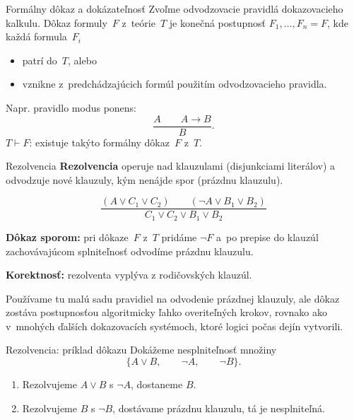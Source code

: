 \documentclass[12pt]{beamer}
\newcommand{\limpl}{\rightarrow}
\begin{document}
\begin{frame}{Formálny dôkaz a dokázateľnosť}
  Zvoľme odvodzovacie pravidlá dokazovacieho kalkulu.
  \alert{Dôkaz formuly~$F$ z~teórie~$T$} je konečná postupnosť
  $F_1,\ldots,F_n=F$, kde každá formula~$F_i$
  \begin{itemize}
    \item patrí do~$T$, alebo
    \item vznikne z~predchádzajúcich formúl použitím odvodzovacieho pravidla.
  \end{itemize}
  Napr. pravidlo modus ponens:
  \[
    \frac{A\qquad A\limpl B}{B}.
  \]
  $T\vdash F$: existuje takýto formálny dôkaz~$F$ z~$T$.
\end{frame}

\begin{frame}{Rezolvencia}
\textbf{Rezolvencia} operuje nad klauzulami (disjunkciami literálov)
a odvodzuje nové klauzuly, kým nenájde spor (prázdnu klauzulu).

\[
\frac{(A \lor C_1\lor C_2) \qquad (\lnot A \lor B_1\lor B_2)}
     {C_1\lor C_2 \lor B_1\lor B_2}
\]

\textbf{Dôkaz sporom:} pri dôkaze~$F$ z~$T$ pridáme $\lnot F$
a~po prepise do klauzúl zachovávajúcom splniteľnosť
odvodíme prázdnu klauzulu.

\textbf{Korektnosť:} rezolventa vyplýva z rodičovských klauzúl.

\medskip
Používame tu malú sadu pravidiel na odvodenie prázdnej klauzuly,
ale dôkaz zostáva postupnosťou algoritmicky ľahko overiteľných krokov,
rovnako ako v~mnohých ďalších dokazovacích systémoch,
ktoré logici počas dejín vytvorili.

\end{frame}

\begin{frame}{Rezolvencia: príklad dôkazu}
Dokážeme nesplniteľnosť množiny
\[
  \{ A\lor B,\qquad \lnot A,\qquad \lnot B\}.
\]
\begin{enumerate}
  \item Rezolvujeme $A\lor B$ s $\lnot A$, dostaneme $B$.
  \item Rezolvujeme $B$ s $\lnot B$, dostávame prázdnu klauzulu,
        tá je nesplniteľná.
\end{enumerate}
\end{frame}
\end{document}
